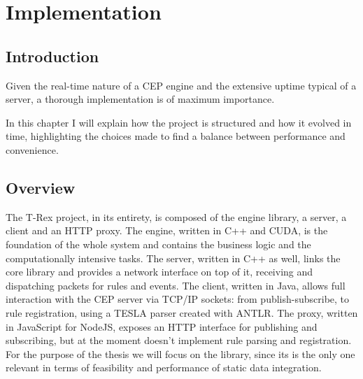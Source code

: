 \chapter{Implementation}

\section{Introduction}
Given the real-time nature of a CEP engine and the extensive uptime typical of a server, a thorough implementation is of maximum importance.

In this chapter I will explain how the project is structured and how it evolved in time, highlighting the choices made to find a balance between performance and convenience.

\section{Overview}
The T-Rex project, in its entirety, is composed of the engine library, a server, a client and an HTTP proxy. The engine, written in C++ and CUDA, is the foundation of the whole system and contains the business logic and the computationally intensive tasks. The server, written in C++ as well, links the core library and provides a network interface on top of it, receiving and dispatching packets for rules and events. The client, written in Java, allows full interaction with the CEP server via TCP/IP sockets: from publish-subscribe, to rule registration, using a TESLA parser created with ANTLR. The proxy, written in JavaScript for NodeJS, exposes an HTTP interface for publishing and subscribing, but at the moment doesn't implement rule parsing and registration. For the purpose of the thesis we will focus on the library, since its is the only one relevant in terms of feasibility and performance of static data integration.

